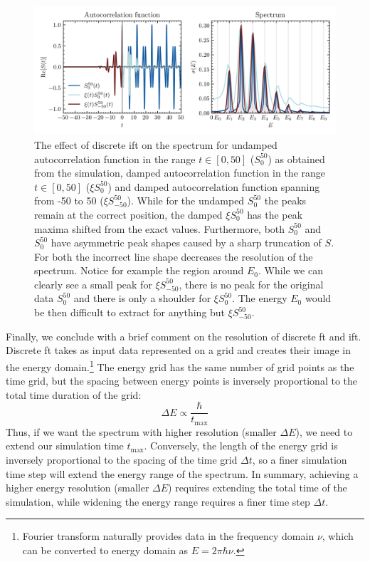 \begin{figure}[ht!]
    \centering
    \includegraphics[width=0.9\linewidth]{scriptum/obrazky/autocorr/autocorr3.png}
    \caption{The effect of discrete \acrshort{ift} on the spectrum for undamped autocorrelation function in the range $t\in[0,50]$ ($S_0^{50}$) as obtained from the simulation, damped autocorrelation function in the range $t\in[0,50]$ ($\xi S_0^{50}$) and damped autocorrelation function spanning from -50 to 50 ($\xi S_{-50}^{50}$). While for the undamped $S_0^{50}$ the peaks remain at the correct position, the damped $\xi S_0^{50}$ has the peak maxima shifted from the exact values. Furthermore, both $S_0^{50}$ and $S_0^{50}$ have asymmetric peak shapes caused by a sharp truncation of $S$. For both the incorrect line shape decreases the resolution of the spectrum. Notice for example the region around $E_0$. While we can clearly see a small peak for $\xi S_{-50}^{50}$, there is no peak for the original data $S_{0}^{50}$ and there is only a shoulder for $\xi S_{0}^{50}$. The energy $E_0$ would be then difficult to extract for anything but $\xi S_{-50}^{50}$.}
    \label{fig:autocorr3}
\end{figure}

Finally, we conclude with a brief comment on the resolution of discrete \acrlong{ft} and \acrlong{ift}. Discrete \acrshort{ft} takes as input data represented on a grid and creates their image in the energy domain.\footnote{Fourier transform naturally provides data in the frequency domain $\nu$, which can be converted to energy domain as $E = 2 \pi \hbar \nu$.} The energy grid has the same number of grid points as the time grid, but the spacing between energy points is inversely proportional to the total time duration of the grid:
\begin{equation}
    \Delta E \propto \frac{\hbar}{t_\mathrm{max}}
\end{equation}
Thus, if we want the spectrum with higher resolution (smaller $\Delta E$), we need to extend our simulation time $t_\mathrm{max}$. Conversely, the length of the energy grid is inversely proportional to the spacing of the time grid $\Delta t$, so a finer simulation time step will extend the energy range of the spectrum. In summary, achieving a higher energy resolution (smaller $\Delta E$) requires extending the total time of the simulation, while widening the energy range requires a finer time step $\Delta t$.

